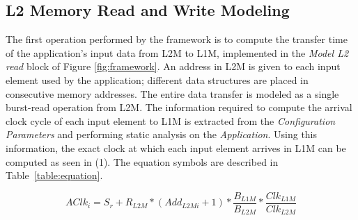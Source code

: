 \subsection{L2 Memory Read and Write Modeling}
\label{ssec:l2_read_model}
\vspace{-1mm}
The first operation performed by the framework is to compute the transfer time of the application's input data from L2M to L1M, implemented in the \textit{Model L2 read} block of Figure \ref{fig:framework}. An address in L2M is given to each input element used by the application; different data structures are placed in consecutive memory addresses. The entire data transfer is modeled as a single burst-read operation from L2M. The information required to compute the arrival clock cycle of each input element to L1M is extracted from the \textit{Configuration Parameters} and performing static analysis on the \textit{Application}.
Using this information, the exact clock at which each input element arrives in L1M can be computed as seen in (1). The equation symbols are described in Table~\ref{table:equation}.

\begin{equation}
AClk_i = S_r + R_{L2M} * (Add_{L2Mi}+1) * \frac{B_{L1M}}{B_{L2M}} * \frac{Clk_{L1M}}{Clk_{L2M}}
\end{equation}

